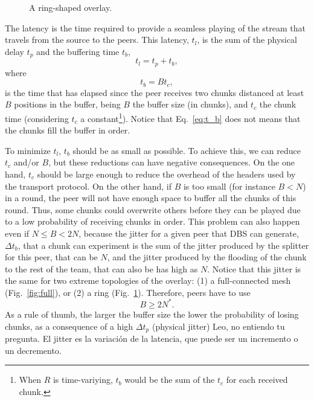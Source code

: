 

\label{sec:latency}

\begin{figure}
  \centering
  \vbox{}
  \caption{A ring-shaped overlay.}
  \label{fig:ring}
\end{figure}

The latency is the time required to provide a seamless playing of
the stream that travels from the source to the peers. This latency,
$t_l$, is the sum of the physical delay $t_p$ and the buffering time
$t_b$,
\begin{equation}
  \label{eq:t_l}
  t_l = t_p + t_b,
\end{equation}
where
\begin{equation}
  \label{eq:t_b}
  t_b = Bt_c,
\end{equation}
is the time that has elapsed since the peer receives two chunks
distanced at least $B$ positions in the buffer, being $B$ the buffer
size (in chunks), and $t_c$ the chunk time (considering $t_c$ a
constant\footnote{When $R$ is time-variying, $t_b$ would be the sum of
  the $t_c$ for each received chunk.}). Notice that Eq.~\ref{eq:t_b}
does not means that the chunks fill the buffer in order.

To minimize $t_l$, $t_b$ should be as small as possible. To achieve
this, we can reduce $t_c$ and/or $B$, but these reductions can have
negative consequences. On the one hand, $t_c$ should be large enough
to reduce the overhead of the headers used by the transport
protocol. On the other hand, if $B$ is too small (for instance $B<N$)
in a round, the peer will not have enough space to buffer all the
chunks of this round. Thus, some chunks could overwrite others before
they can be played due to a low probability of receiving chunks in
order. This problem can also happen even if $N\leq B<2N$, because the
jitter for a given peer that DBS can generate, $\Delta t_b$, that a
chunk can experiment is the sum of the jitter produced by the splitter
for this peer, that can be $N$, and the jitter produced by the
flooding of the chunk to the rest of the team, that can also be has
high as $N$. Notice that this jitter is the same for two extreme
topologies of the overlay: (1) a full-connected mesh
(Fig.~\ref{fig:full}), or (2) a ring
(Fig.~\ref{fig:ring}). Therefore, peers have to use
\begin{equation}
  \label{eq:minimum_B}
  B\ge 2N^*.
\end{equation}
As a rule of thumb, the larger the buffer size the lower the
probability of losing chunks, as a consequence of a high $\Delta t_p$
(physical jitter)  {\color{red}
  Leo, no entiendo tu pregunta. El jitter es la variación de la
  latencia, que puede ser un incremento o un decremento}.

